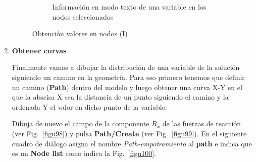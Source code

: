 \begin{enumerate}
\begin{figure}[H]
\begin{subfigure}{0.39\textwidth}
     \caption{Información en modo texto de una variable en los nodos
       seleccionados}
     \label{figu97}
   \end{subfigure}%
   \caption{Obtención valores en nodos (I)}
 \end{figure}



 
\item \textbf{Obtener curvas} ~

  Finalmente vamos a dibujar la distribución de una variable de la
  solución siguiendo un camino en la geometría. Para eso primero
  tenemos que definir un camino (\textbf{Path}) dentro del modelo y
  luego obtener una curva X-Y en el que la abscisa X sea la distancia
  de un punto siguiendo el camino y la ordenada Y el valor en dicho
  punto de la variable.

  Dibuja de nuevo el campo de la componente $R_{x}$ de las fuerzas de
  reacción (ver Fig.~\ref{figu98}) y pulsa \textbf{Path/Create} (ver
  Fig.~\ref{figu99}). En el siguiente cuadro de diálogo asigna el
  nombre \textit{Path-empotramiento} al \textbf{path} e indica que es
  un \textbf{Node list} como indica la Fig.~\ref{figu100}.


\end{enumerate}
